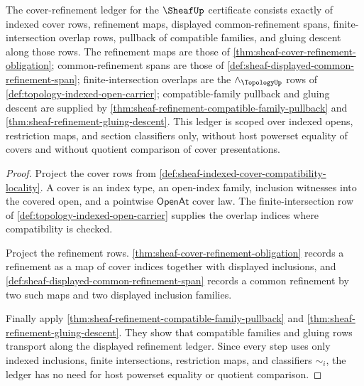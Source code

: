 \begin{theorem}
\label{thm:sheaf-cover-refinement-ledger-scope}
The cover-refinement ledger for the $\SheafUp$ certificate consists exactly of indexed cover rows, refinement maps, displayed common-refinement spans, finite-intersection overlap rows, pullback of compatible families, and gluing descent along those rows. The refinement maps are those of \autoref{thm:sheaf-cover-refinement-obligation}; common-refinement spans are those of \autoref{def:sheaf-displayed-common-refinement-span}; finite-intersection overlaps are the $\wedge_{\TopologyUp}$ rows of \autoref{def:topology-indexed-open-carrier}; compatible-family pullback and gluing descent are supplied by \autoref{thm:sheaf-refinement-compatible-family-pullback} and \autoref{thm:sheaf-refinement-gluing-descent}. This ledger is scoped over indexed opens, restriction maps, and section classifiers only, without host powerset equality of covers and without quotient comparison of cover presentations.
\end{theorem}
\begin{proof}
Project the cover rows from \autoref{def:sheaf-indexed-cover-compatibility-locality}. A cover is an index type, an open-index family, inclusion witnesses into the covered open, and a pointwise $\mathsf{OpenAt}$ cover law. The finite-intersection row of \autoref{def:topology-indexed-open-carrier} supplies the overlap indices where compatibility is checked.

Project the refinement rows. \autoref{thm:sheaf-cover-refinement-obligation} records a refinement as a map of cover indices together with displayed inclusions, and \autoref{def:sheaf-displayed-common-refinement-span} records a common refinement by two such maps and two displayed inclusion families.

Finally apply \autoref{thm:sheaf-refinement-compatible-family-pullback} and \autoref{thm:sheaf-refinement-gluing-descent}. They show that compatible families and gluing rows transport along the displayed refinement ledger. Since every step uses only indexed inclusions, finite intersections, restriction maps, and classifiers $\sim_i$, the ledger has no need for host powerset equality or quotient comparison.
\end{proof}

